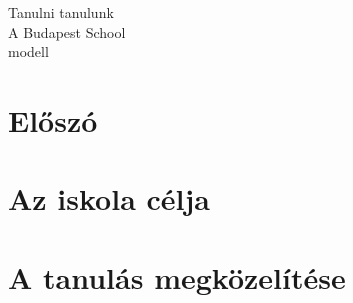\documentclass[10pt,a4paper, openright,twoside]{book}
\newcommand{\chaptercover}[1]{
    \cleardoublepage
    
}
\begin{document}
\pagestyle{empty}

\begin{titlepage} %

	\centering %
	
	\scshape %
	
  \vspace*{\baselineskip} %
  {\Large Tanulni tanulunk}\\
  A Budapest School\\
    modell
\end{titlepage}





\tableofcontents

\chapter*{Előszó}
\begin{spacing}{.9999}

\end{spacing}


\chaptercover{pics/chapter_covers/1e.jpg}

\pagestyle{main}
\chapter{Az iskola célja}



\label{sec:alapelvek}



\chaptercover{pics/chapter_covers/2e.jpg}
\chapter{A tanulás megközelítése}





\chaptercover{pics/chapter_covers/3e.jpg}
\end{document}
